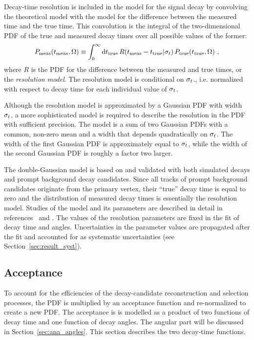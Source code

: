 Decay-time resolution is included in the model for the signal decay by convolving the theoretical model with the model for the difference
between the measured time and the true time. This convolution is the integral of the two-dimensional PDF of the true and measured decay
times over all possible values of the former:
\begin{equation}
  P_\text{meas}(t_\text{meas}, \Omega)
    \equiv \int_0^\infty \ud t_\text{true}\, R(t_\text{meas} - t_\text{true}|\sigmat)\, P_\text{true}(t_\text{true}, \Omega)\ ,
\end{equation}
where $R$ is the PDF for the difference between the measured and true times, or the \emph{resolution model}. The resolution model is
conditional on $\sigma_t$., i.e. normalized with respect to decay time for each individual value of $\sigma_t$.

Although the resolution model is approximated by a Gaussian PDF with width $\sigma_t$, a more sophisticated model is required to describe
the resolution in the PDF with sufficient precision. The model is a sum of two Gaussian PDFs with a common, non-zero mean and a width that
depends quadratically on $\sigma_t$. The width of the first Gaussian PDF is approximately equal to $\sigma_t$, while the width of the second
Gaussian PDF is roughly a factor two larger.

The double-Gaussian model is based on and validated with both simulated \BstoJpsiKK{} decays and prompt background decay candidates. Since
all tracks of prompt background candidates originate from the primary vertex, their ``true'' decay time is equal to zero and the
distribution of measured decay times is essentially the resolution model. Studies of the model and its parameters are described in detail
in references~\cite{Aaij:2015} and \cite{LHCb-ANA-2014-039}. The values of the resolution parameters are fixed in the fit of decay time and
angles. Uncertainties in the parameter values are propagated after the fit and accounted for as systematic uncertainties (see
Section~\ref{sec:result_syst}).


\subsection{Acceptance}
\label{subsec:ana_time_acc}

To account for the efficiencies of the decay-candidate reconstruction and selection processes, the PDF is multiplied by an acceptance
function and re-normalized to create a new PDF. The acceptance is is modelled as a product of two functions of decay time and one function
of decay angles. The angular part will be discussed in Section~\ref{sec:ana_angles}. This section describes the two decay-time functions.

